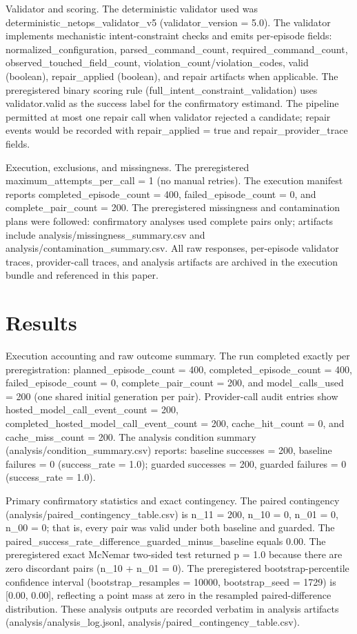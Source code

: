 \documentclass[conference]{IEEEtran}
\begin{document}
Validator and scoring. The deterministic validator used was deterministic\_netops\_validator\_v5 (validator\_version = 5.0). The validator implements mechanistic intent-constraint checks and emits per-episode fields: normalized\_configuration, parsed\_command\_count, required\_command\_count, observed\_touched\_field\_count, violation\_count/violation\_codes, valid (boolean), repair\_applied (boolean), and repair artifacts when applicable. The preregistered binary scoring rule (full\_intent\_constraint\_validation) uses validator.valid as the success label for the confirmatory estimand. The pipeline permitted at most one repair call when validator rejected a candidate; repair events would be recorded with repair\_applied = true and repair\_provider\_trace fields.

Execution, exclusions, and missingness. The preregistered maximum\_attempts\_per\_call = 1 (no manual retries). The execution manifest reports completed\_episode\_count = 400, failed\_episode\_count = 0, and complete\_pair\_count = 200. The preregistered missingness and contamination plans were followed: confirmatory analyses used complete pairs only; artifacts include analysis/missingness\_summary.csv and analysis/contamination\_summary.csv. All raw responses, per-episode validator traces, provider-call traces, and analysis artifacts are archived in the execution bundle and referenced in this paper.

\section{Results}
Execution accounting and raw outcome summary. The run completed exactly per preregistration: planned\_episode\_count = 400, completed\_episode\_count = 400, failed\_episode\_count = 0, complete\_pair\_count = 200, and model\_calls\_used = 200 (one shared initial generation per pair). Provider-call audit entries show hosted\_model\_call\_event\_count = 200, completed\_hosted\_model\_call\_event\_count = 200, cache\_hit\_count = 0, and cache\_miss\_count = 200. The analysis condition summary (analysis/condition\_summary.csv) reports: baseline successes = 200, baseline failures = 0 (success\_rate = 1.0); guarded successes = 200, guarded failures = 0 (success\_rate = 1.0).

Primary confirmatory statistics and exact contingency. The paired contingency (analysis/paired\_contingency\_table.csv) is n\_11 = 200, n\_10 = 0, n\_01 = 0, n\_00 = 0; that is, every pair was valid under both baseline and guarded. The paired\_success\_rate\_difference\_guarded\_minus\_baseline equals 0.00. The preregistered exact McNemar two-sided test returned p = 1.0 because there are zero discordant pairs (n\_10 + n\_01 = 0). The preregistered bootstrap-percentile confidence interval (bootstrap\_resamples = 10000, bootstrap\_seed = 1729) is [0.00, 0.00], reflecting a point mass at zero in the resampled paired-difference distribution. These analysis outputs are recorded verbatim in analysis artifacts (analysis/analysis\_log.jsonl, analysis/paired\_contingency\_table.csv).
\end{document}
